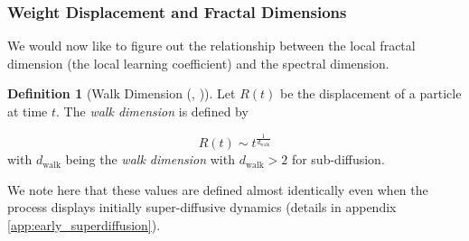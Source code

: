 \documentclass{article} %
\theoremstyle{definition}
\newtheorem{definition}{Definition}[section]
\begin{document}
\subsubsection{Weight Displacement and Fractal Dimensions}
We would now like to figure out the relationship between the local fractal dimension (the local learning coefficient) and the spectral dimension. %
\begin{definition}[Walk Dimension (\citep{PALADIN1987147}, \citep{BOUCHAUD1990127})]\label{walk_dim}
Let $R(t)$ be the displacement of a particle at time $t$. The \textit{walk dimension} is defined by

\begin{equation}\label{eq:disp}
    R(t) \sim t^{\frac{1}{d_\text{walk}}}
\end{equation}
with $d_\text{walk}$ being the \textit{walk dimension} with $d_\text{walk}>2$ for sub-diffusion. %
\end{definition}
We note here that these values are defined almost identically even when the process displays initially super-diffusive dynamics (details in appendix \ref{app:early_superdiffusion}).
\end{document}
